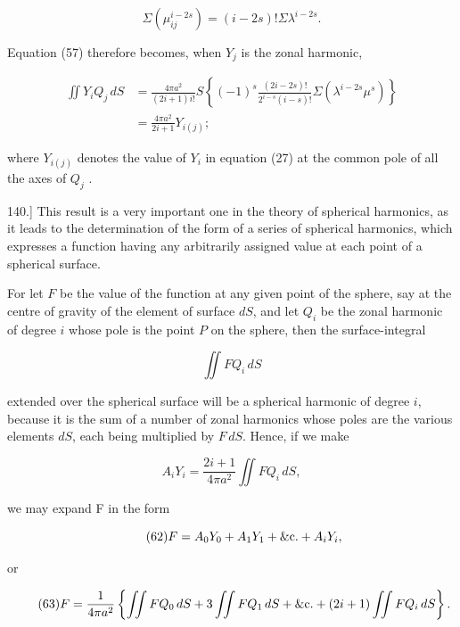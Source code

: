 \documentclass[11pt,a4paper]{article}
\begin{document}
\begin{equation}\tag{59}
\Sigma(\mu_{ij}^{i-2s})=(i-2s)!\Sigma\lambda^{i-2s}.
\end{equation}

Equation (57) therefore becomes, when  $Y_j$  is the zonal harmonic,

\begin{equation}\tag{60}
\begin{split}
\iint Y_iQ_j\,dS
&=\frac{4\pi a^2}{(2i+1)i!}S\left\{(-1)^s
\frac{(2i-2s)!}{2^{i-s}(i-s)!}\Sigma(\lambda^{i-2s}\mu^s)\right\}\\
&=\frac{4\pi a^2}{2i+1}Y_{i(j)};
\end{split}
\end{equation}

where  $Y_{i(j)}$  denotes the value of  $Y_i$  in equation (27) at the common pole of all the axes of  $Q_j$ .

140.] This result is a very important one in the theory of spherical harmonics, as it leads to the determination of the form of a series of spherical harmonics, which expresses a function having any arbitrarily assigned value at each point of a spherical surface.

For let $F$ be the value of the function at any given point of the sphere, say at the centre of gravity of the element of surface $dS$, and let $Q_i$ be the zonal harmonic of degree $i$ whose pole is the point $P$ on the sphere, then the surface-integral

\[
\iint FQ_i\,dS
\]

extended over the spherical surface will be a spherical harmonic of degree $i$, because it is the sum of a number of zonal harmonics whose poles are the various elements $dS$, each being multiplied by $F\,dS$. Hence, if we make

\begin{equation}\tag{61}
A_iY_i=\frac{2i+1}{4\pi a^2}\iint FQ_i\,dS,
\end{equation}

we may expand F in the form

\begin{equation}\tag{62}
F=A_0Y_0+A_1Y_1+\hbox{\&c.}+A_iY_i,
\end{equation}

or

\begin{equation}\tag{63}
F=\frac{1}{4\pi a^2}\left\{\iint FQ_0\,dS+3\iint FQ_1\,dS+\hbox{\&c.}+(2i+1)\iint FQ_i\,dS\right\}.
\end{equation}
\end{document}
